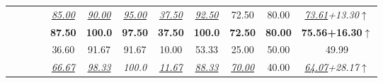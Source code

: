 \begin{table*}[thbp]
{{\begin{tabular}{c|c|c|c|cccccccc}
                                                     &                                                &                                                  &                                           & \textit{\uline{85.00}}                             & \textit{\uline{90.00}}                             & \textit{\uline{95.00}}                             & \textit{\uline{37.50}}                                     & \textit{\uline{92.50}}                             & 72.50                                              & 80.00                                                        & \textit{\uline{73.61}{\footnotesize\textcolor{myred}{+13.30$\uparrow$}}}                              \\
                                                     &                                                &                                                  & {}{} & {}\textbf{87.50} & {}\textbf{100.0} & {}\textbf{97.50} & {}\textbf{37.50}         & {}\textbf{100.0} & {}\textbf{72.50} & {}\textbf{80.00}           & {}\textbf{75.56{\footnotesize\textcolor{myred}{+16.30$\uparrow$}}}  \\ 
                                                     &                                                &  &                                                        & 36.60                                              & 91.67                                              & 91.67                                              & 10.00                                                      & 53.33                                              & 25.00                                              & 50.00                                                        & 49.99                                               \\
                                                     &                                                &                                                  &                                          & \textit{\uline{66.67}}                             & \textit{\uline{98.33}}                             & \textit{{100.0}}                             & \textit{\uline{11.67}}                                     & \textit{\uline{88.33}}                             & \textit{\uline{70.00}}                             & 40.00                                                        & \textit{\uline{64.07}{\footnotesize\textcolor{myred}{+28.17$\uparrow$}}}                              \\

\end{tabular}}}
\end{table*}

